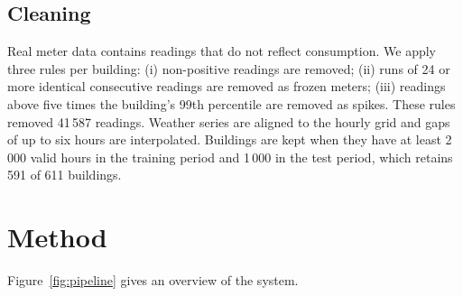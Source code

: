 \documentclass[11pt,a4paper]{article}
\begin{document}
\subsection{Cleaning}
Real meter data contains readings that do not reflect consumption. We apply three rules per building:
(i) non-positive readings are removed; (ii) runs of 24 or more identical consecutive readings are removed as frozen
meters; (iii) readings above five times the building's 99th percentile are removed as spikes. These rules removed
41\,587 readings. Weather series are aligned to the hourly grid and gaps of up to six hours are interpolated.
Buildings are kept when they have at least 2\,000 valid hours in the training period and 1\,000 in the test period,
which retains 591 of 611 buildings.

\section{Method}\label{sec:method}

Figure~\ref{fig:pipeline} gives an overview of the system.
\end{document}
